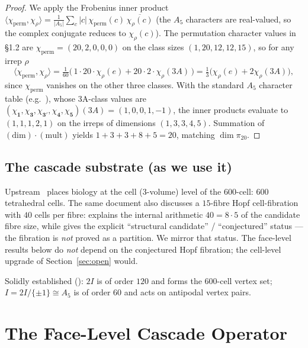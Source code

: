 \documentclass[12pt]{article}
\begin{document}
\begin{proof}
We apply the Frobenius inner product
$\langle \chi_{\mathrm{perm}}, \chi_\rho\rangle
= \tfrac{1}{|A_5|}\sum_c |c|\,\chi_{\mathrm{perm}}(c)\,\overline{\chi_\rho(c)}$
(the $A_5$ characters are real-valued, so the complex conjugate
reduces to $\chi_\rho(c)$). The permutation character values in
§1.2 are $\chi_{\mathrm{perm}} = (20, 2, 0, 0, 0)$ on the class
sizes $(1, 20, 12, 12, 15)$, so for any irrep $\rho$
\[
\langle \chi_{\mathrm{perm}}, \chi_\rho\rangle
= \tfrac{1}{60}\bigl(\,1\cdot 20\cdot \chi_\rho(e)
+ 20\cdot 2\cdot \chi_\rho(3A)\,\bigr)
= \tfrac{1}{3}\bigl(\chi_\rho(e) + 2\chi_\rho(3A)\bigr),
\]
since $\chi_{\mathrm{perm}}$ vanishes on the other three classes.
With the standard $A_5$ character table (e.g.~\cite{ATLAS}), whose
3A-class values are $(\chi_{\mathbf{1}}, \chi_{\mathbf{3}},
\chi_{\mathbf{3}'}, \chi_{\mathbf{4}}, \chi_{\mathbf{5}})(3A) =
(1, 0, 0, 1, -1)$, the inner products evaluate to
$(1, 1, 1, 2, 1)$ on the irreps of dimensions $(1, 3, 3, 4, 5)$.
Summation of $(\text{dim})\cdot(\text{mult})$ yields
$1 + 3 + 3 + 8 + 5 = 20$, matching $\dim\pi_{20}$.
\end{proof}

\subsection{The cascade substrate (as we use it)}

Upstream~\cite[\S 3.1]{CascadeBio} places biology at the cell
(3-volume) level of the 600-cell: $600$ tetrahedral cells. The same
document also discusses a $15$-fibre Hopf cell-fibration with $40$
cells per fibre: \cite[\S 3.2]{CascadeBio} explains the internal
arithmetic $40 = 8 \cdot 5$ of the candidate fibre size, while
\cite[\S 2.6]{CascadeBio} gives the explicit ``structural
candidate'' / ``conjectured'' status --- the fibration is
\emph{not} proved as a partition. We mirror that status. The
face-level results below do \emph{not} depend on the conjectured
Hopf fibration; the cell-level upgrade of Section~\ref{sec:open}
would.

Solidly established (\cite[\S 2.1--2.3]{CascadeBio}): $2I$ is of
order $120$ and forms the 600-cell vertex set; $I = 2I/\{\pm 1\}
\cong A_5$ is of order $60$ and acts on antipodal vertex pairs.

\section{The Face-Level Cascade Operator}\label{sec:operator}
\end{document}
